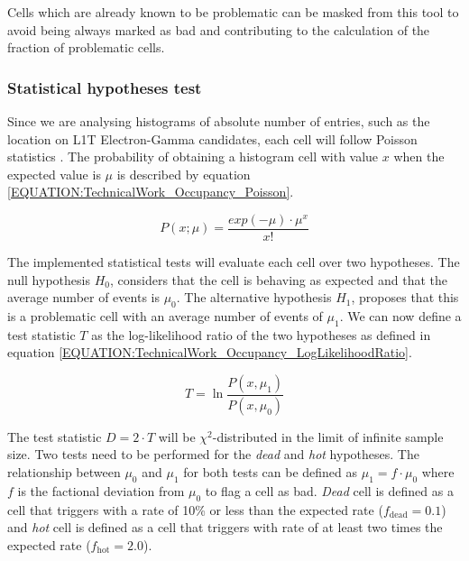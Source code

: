 Cells which are already known to be problematic can be masked from this tool to avoid being always marked as bad and contributing to the calculation of the fraction of problematic cells.

\subsubsection{Statistical hypotheses test}


Since we are analysing histograms of absolute number of entries, such as the location on \gls{L1T} Electron-Gamma candidates, each cell will follow Poisson statistics \cite{BOOK:AppliedStatisticsAndProbabilityforEngineers}. The probability of obtaining a histogram cell with value $x$ when the expected value is $\mu$ is described by equation \ref{EQUATION:TechnicalWork_Occupancy_Poisson}.

\begin{equation}
P(x;\mu)=\frac{exp(-\mu) \cdot \mu^{x}}{x!}
\label{EQUATION:TechnicalWork_Occupancy_Poisson}
\end{equation}

The implemented statistical tests will evaluate each cell over two hypotheses. The null hypothesis $H_0$, considers that the cell is behaving as expected and that the average number of events is $\mu_0$. The alternative hypothesis $H_1$, proposes that this is a problematic cell with an average number of events of $\mu_1$. We can now define a test statistic $T$ as the log-likelihood ratio of the two hypotheses as defined in equation \ref{EQUATION:TechnicalWork_Occupancy_LogLikelihoodRatio}.

\begin{equation}
T=\ln\frac{P(x,\mu_1)}{P(x,\mu_0)}
\label{EQUATION:TechnicalWork_Occupancy_LogLikelihoodRatio}
\end{equation}

The test statistic $D=2 \cdot T$ will be $\chi^2$-distributed in the limit of infinite sample size. Two tests need to be performed for the \textit{dead} and \textit{hot} hypotheses. The relationship between $\mu_0$ and $\mu_1$ for both tests can be defined as $\mu_1=f \cdot \mu_0$ where $f$ is the factional deviation from $\mu_0$ to flag a cell as bad. \textit{Dead} cell is defined as a cell that triggers with a rate of 10\% or less than the expected rate ($f_{\text{dead}}=0.1$) and \textit{hot} cell is defined as a cell that triggers with rate of at least two times the expected rate ($f_{\text{hot}}=2.0$).

